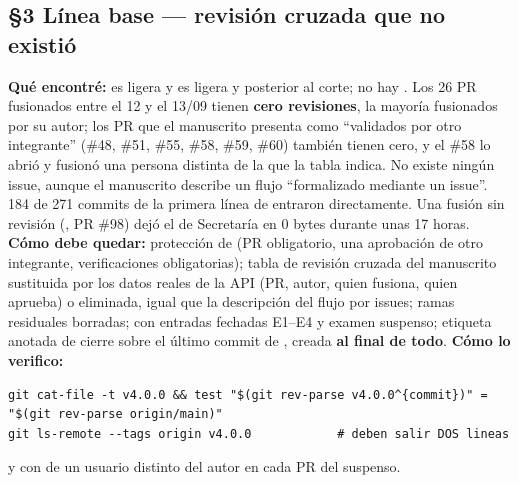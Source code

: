 \subsection*{\S3 L\'inea base --- revisi\'on cruzada que no existi\'o}
\textbf{Qu\'e encontr\'e:}  es ligera y  es ligera y posterior al corte; no hay . Los 26 PR fusionados entre el 12 y el 13/09 tienen \textbf{cero revisiones}, la mayor\'ia fusionados por su autor; los PR que el manuscrito presenta como ``validados por otro integrante'' (\#48, \#51, \#55, \#58, \#59, \#60) tambi\'en tienen cero, y el \#58 lo abri\'o y fusion\'o una persona distinta de la que la tabla indica. No existe ning\'un issue, aunque el manuscrito describe un flujo ``formalizado mediante un issue''. 184 de 271 commits de la primera l\'inea de  entraron directamente. Una fusi\'on sin revisi\'on (, PR \#98) dej\'o el  de Secretar\'ia en 0 bytes durante unas 17 horas. \textbf{C\'omo debe quedar:} protecci\'on de  (PR obligatorio, una aprobaci\'on de otro integrante, verificaciones obligatorias); tabla de revisi\'on cruzada del manuscrito sustituida por los datos reales de la API (PR, autor, quien fusiona, quien aprueba) o eliminada, igual que la descripci\'on del flujo por issues; ramas residuales borradas;  con entradas fechadas E1--E4 y examen suspenso; etiqueta anotada de cierre sobre el \'ultimo commit de , creada \textbf{al final de todo}. \textbf{C\'omo lo verifico:}\begin{verbatim}
git cat-file -t v4.0.0 && test "$(git rev-parse v4.0.0^{commit})" = "$(git rev-parse origin/main)"
git ls-remote --tags origin v4.0.0            # deben salir DOS lineas
\end{verbatim}
y  con  de un usuario distinto del autor en cada PR del suspenso.

